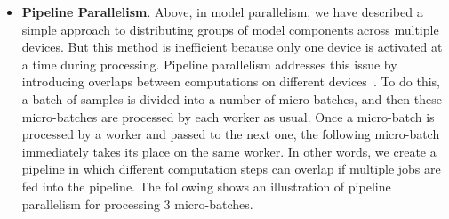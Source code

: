 \begin{itemize}
\item \vspace{0.3em} \textbf{Pipeline Parallelism}. Above, in model parallelism, we have described a simple approach to distributing groups of model components across multiple devices. But this method is inefficient because only one device is activated at a time during processing. Pipeline parallelism addresses this issue by introducing overlaps between computations on different devices~\cite{harlap-etal:2018pipedream,huang-etal:2019gpipe}. To do this, a batch of samples is divided into a number of micro-batches, and then these micro-batches are processed by each worker as usual. Once a micro-batch is processed by a worker and passed to the next one, the following micro-batch immediately takes its place on the same worker. In other words, we create a pipeline in which different computation steps can overlap if multiple jobs are fed into the pipeline. The following shows an illustration of pipeline parallelism for processing 3 micro-batches.
\end{itemize}

    \vspace{0.5em}
    \begin{center}
    \begingroup
    \endgroup
    \end{center}
    \vspace{0.5em}

